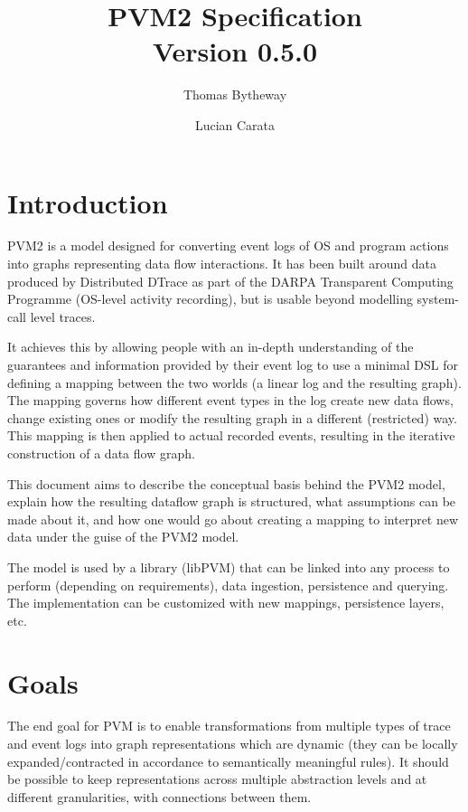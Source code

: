 \documentclass[12pt,twoside,a4paper]{article}
\begin{document}
\title{PVM2 Specification\\\normalsize Version 0.5.0}
\author{Thomas Bytheway \and Lucian Carata}

\maketitle

\clearpage

\section{Introduction}
\label{sec:intro}
PVM2 is a model designed for converting event logs of OS and program actions into graphs representing data flow interactions. It has been built around data produced by Distributed DTrace as part of the DARPA Transparent Computing Programme (OS-level activity recording), but is usable beyond modelling system-call level traces.

It achieves this by allowing people with an in-depth understanding of the guarantees and information provided by their event log to use a minimal DSL for defining a mapping between the two worlds (a linear log and the resulting graph). 
The mapping governs how different event types in the log create new data flows, change existing ones or modify the resulting graph in a different (restricted) way. 
This mapping is then applied to actual recorded events, resulting in the iterative construction of a data flow graph.

This document aims to describe the conceptual basis behind the PVM2 model, explain how the resulting dataflow graph is structured, what assumptions can be made about it, and how one would go about creating a mapping to interpret new data under the guise of the PVM2 model.

The model is used by a library (libPVM) that can be linked into any process to perform (depending on requirements), data ingestion, persistence and querying. The implementation can be customized with new mappings, persistence layers, etc.

\section{Goals}
The end goal for PVM is to enable transformations from multiple types of trace and event logs into graph representations which are dynamic (they can be locally expanded/contracted in accordance to semantically meaningful rules). It should be possible to keep representations across multiple abstraction levels and at different granularities, with connections between them.
\end{document}
